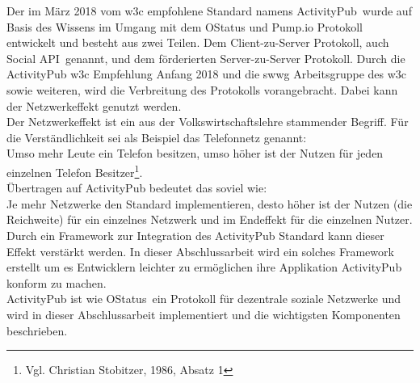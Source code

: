 {	Der im März 2018 vom \gls{w3c} empfohlene Standard namens \glqq ActivityPub\grqq~wurde auf Basis des Wissens im Umgang mit dem OStatus und Pump.io Protokoll entwickelt und besteht aus zwei Teilen. Dem Client-zu-Server Protokoll, auch \glqq Social API\grqq~genannt, und dem förderierten Server-zu-Server Protokoll. Durch die ActivityPub \gls{w3c} Empfehlung Anfang 2018 und die \gls{swwg} Arbeitsgruppe des \gls{w3c} sowie weiteren, wird die Verbreitung des Protokolls vorangebracht. Dabei kann der Netzwerkeffekt genutzt werden.\\
	
	Der Netzwerkeffekt ist ein aus der Volkswirtschaftslehre stammender Begriff. Für die Verständlichkeit sei als Beispiel das Telefonnetz genannt:\\
	Umso mehr Leute ein Telefon besitzen, umso höher ist der Nutzen für jeden einzelnen Telefon Besitzer\footnote{Vgl. Christian Stobitzer, 1986, Absatz 1}.\\
	Übertragen auf ActivityPub bedeutet das soviel wie:\\
	\glqq Je mehr Netzwerke den Standard implementieren, desto höher ist der Nutzen (die Reichweite) für ein einzelnes Netzwerk und im Endeffekt für die einzelnen Nutzer\grqq.\\
	
	Durch ein Framework zur Integration des ActivityPub Standard kann dieser Effekt verstärkt werden. In dieser Abschlussarbeit wird ein solches Framework erstellt um es Entwicklern leichter zu ermöglichen ihre Applikation ActivityPub konform zu machen.\\
	
	ActivityPub ist wie \glqq OStatus\grqq~ein Protokoll für dezentrale soziale Netzwerke und wird in dieser Abschlussarbeit implementiert und die wichtigsten Komponenten beschrieben.
}